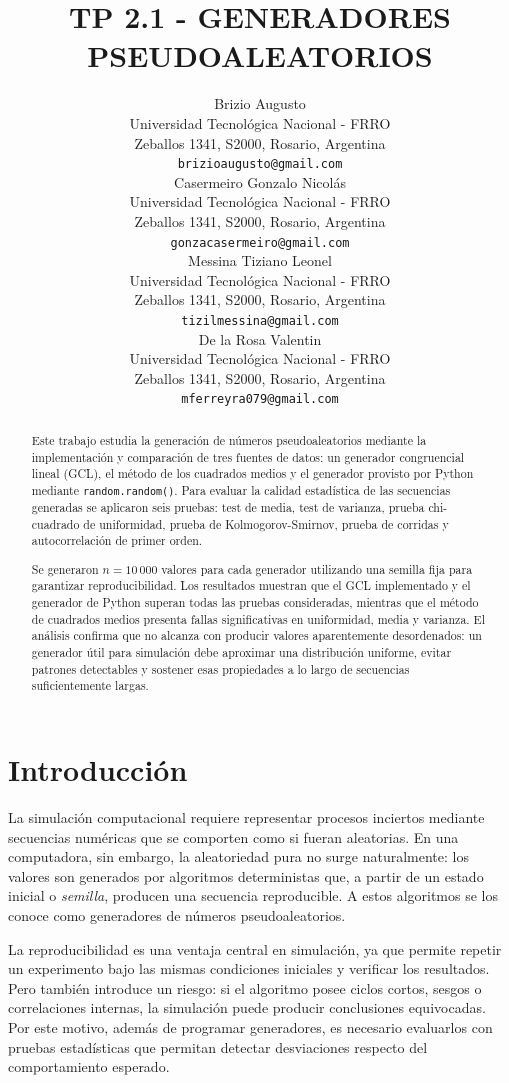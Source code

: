 \documentclass{article}
\title{TP 2.1 - GENERADORES PSEUDOALEATORIOS}
\author{
  Brizio Augusto \\
  Universidad Tecnológica Nacional - FRRO \\
  Zeballos 1341, S2000, Rosario, Argentina \\
  \texttt{brizioaugusto@gmail.com} \\
  \And
  Casermeiro Gonzalo Nicolás \\
  Universidad Tecnológica Nacional - FRRO \\
  Zeballos 1341, S2000, Rosario, Argentina \\
  \texttt{gonzacasermeiro@gmail.com} \\
  \And
  Messina Tiziano Leonel \\
  Universidad Tecnológica Nacional - FRRO \\
  Zeballos 1341, S2000, Rosario, Argentina \\
  \texttt{tizilmessina@gmail.com} \\
  \And
  De la Rosa Valentin \\
  Universidad Tecnológica Nacional - FRRO \\
  Zeballos 1341, S2000, Rosario, Argentina \\
  \texttt{mferreyra079@gmail.com} \\
}
\begin{document}
\maketitle

\begin{abstract}
Este trabajo estudia la generación de números pseudoaleatorios mediante la
implementación y comparación de tres fuentes de datos: un generador congruencial
lineal (GCL), el método de los cuadrados medios y el generador provisto por
Python mediante \texttt{random.random()}. Para evaluar la calidad estadística de
las secuencias generadas se aplicaron seis pruebas: test de media, test de
varianza, prueba chi-cuadrado de uniformidad, prueba de Kolmogorov-Smirnov,
prueba de corridas y autocorrelación de primer orden.

Se generaron $n = 10\,000$ valores para cada generador utilizando una semilla
fija para garantizar reproducibilidad. Los resultados muestran que el GCL
implementado y el generador de Python superan todas las pruebas consideradas,
mientras que el método de cuadrados medios presenta fallas significativas en
uniformidad, media y varianza. El análisis confirma que no alcanza con producir
valores aparentemente desordenados: un generador útil para simulación debe
aproximar una distribución uniforme, evitar patrones detectables y sostener esas
propiedades a lo largo de secuencias suficientemente largas.
\end{abstract}

\section{Introducción}

La simulación computacional requiere representar procesos inciertos mediante
secuencias numéricas que se comporten como si fueran aleatorias. En una
computadora, sin embargo, la aleatoriedad pura no surge naturalmente: los valores
son generados por algoritmos deterministas que, a partir de un estado inicial o
\textit{semilla}, producen una secuencia reproducible. A estos algoritmos se los
conoce como generadores de números pseudoaleatorios.

La reproducibilidad es una ventaja central en simulación, ya que permite repetir
un experimento bajo las mismas condiciones iniciales y verificar los resultados.
Pero también introduce un riesgo: si el algoritmo posee ciclos cortos, sesgos o
correlaciones internas, la simulación puede producir conclusiones equivocadas.
Por este motivo, además de programar generadores, es necesario evaluarlos con
pruebas estadísticas que permitan detectar desviaciones respecto del
comportamiento esperado.
\end{document}
